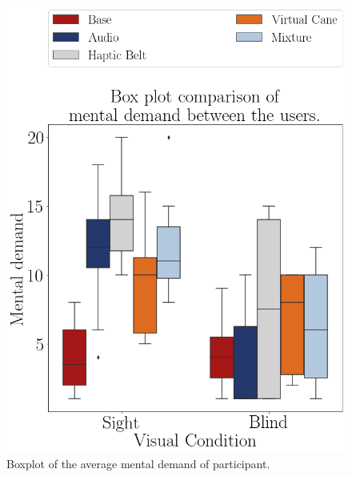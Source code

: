 \begin{figure}[!htb]
    \begin{minipage}{.45\linewidth}
        \centering
        \includegraphics[width = \linewidth]{Resultados/Nasa/Figuras/png/boxplot_md_scene.png}
        \caption{Boxplot of the average mental demand of participant.}
        \label{fig:boxplot_md_scene}
    \end{minipage}
    \begin{minipage}{.1\linewidth}
        \hfill
    \end{minipage}
    \begin{minipage}{.45\linewidth}
        

\end{minipage}
\end{figure}
